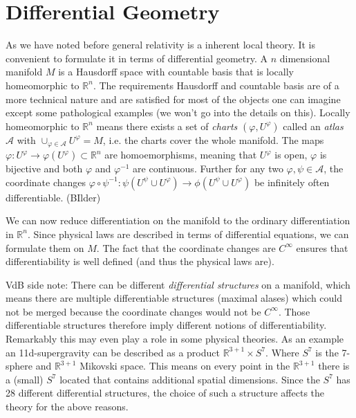 \chapter{Differential Geometry}
As we have noted before general relativity is a inherent local theory. It is convenient to formulate it in terms of differential geometry.
A $n$ dimensional manifold $M$ is a Hausdorff space with countable basis that is locally homeomorphic to $\mathbb{R}^n$. 
The requirements Hausdorff and countable basis are of a more technical nature and are satisfied for most of the objects one can imagine 
except some pathological examples (we won't go into the details on this).
Locally homeomorphic to $\mathbb{R}^n$ means there exists a set of \emph{charts} 
$(\varphi,U^\varphi)$ called an \emph{atlas} $\mathcal{A}$ with $\cup_{\varphi\in\mathcal{A}} U^\varphi =M$, 
i.e. the charts cover the whole manifold. The maps $\varphi:U^\varphi\to \varphi(U^\varphi)\subset\mathbb{R}^n $ are homoemorphisms, 
meaning that $U^\varphi$ is open, $\varphi$ is bijective and both $\varphi$ and $\varphi^{-1}$ are continuous.
Further for any two $\varphi,\psi\in \mathcal{A}$, the coordinate changes 
$\varphi\circ\psi^{-1}:\psi(U^\psi\cup U^\varphi)\to \phi(U^\psi\cup U^\varphi)$ be infinitely often differentiable.
(BIlder)

We can now reduce differentiation on the manifold to the ordinary differentiation in $\mathbb{R}^n$. 
Since physical laws are described in terms of differential equations, we can formulate them on $M$. 
The fact that the coordinate changes are $C^\infty$ ensures that differentiability is well defined (and thus the physical laws are).

VdB side note: There can be different \emph{differential structures} on a manifold, 
which means there are multiple differentiable structures (maximal alases) which could not be merged because the coordinate changes 
would not be $C^\infty$. Those differentiable structures therefore imply different notions of differentiability. 
Remarkably this may even play a role in some physical theories. 
As an example an 11d-supergravity can be described as a product $\mathbb{R}^{3+1}\times S^7$. 
Where $S^7$ is the 7-sphere and $\mathbb{R}^{3+1}$ Mikovski space.
This means on every point in the $\mathbb{R}^{3+1}$ there is a (small) $S^7$  located that contains additional spatial dimensions. 
Since the $S^7$ has 28 different differential structures, the choice of such a structure affects the theory for the above reasons.

